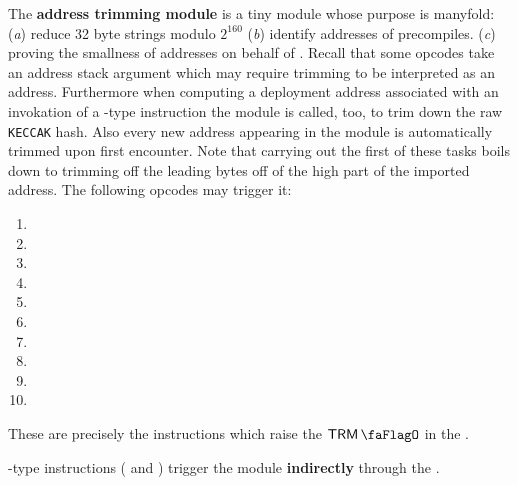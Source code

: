 The \textbf{address trimming module} is a tiny module whose purpose is manyfold:
(\emph{a})
reduce 32 byte strings modulo $2^{160}$
(\emph{b})
identify addresses of precompiles.
(\emph{c})
proving the smallness of addresses on behalf of \rlpTxnMod{}.
Recall that some opcodes take an address stack argument which may require trimming to be interpreted as an address.
Furthermore when computing a deployment address associated with an invokation of a -type instruction the \rlpAddrMod{} module is called, too, to trim down the raw \texttt{KECCAK} hash.
Also every new address appearing in the \hubMod{} module is automatically trimmed upon first encounter.
Note that carrying out the first of these tasks boils down to trimming off the leading bytes off of the high part of the imported address. The following opcodes may trigger it:
\begin{multicols}{4}
\begin{enumerate}
	\item {}
	\item {}
	\item {}
	\item {}
	\item {}
	\item {}
	\item {}
	\item {}
	\item {}
	\item[\vspace{\fill}]
\end{enumerate}
\end{multicols}
These are precisely the instructions which raise the $\trmFlag$ in the \hubMod{}.

\saNote{} -type instructions ( and ) trigger the \trmMod{} module \textbf{indirectly} through the \rlpAddrMod{}.
